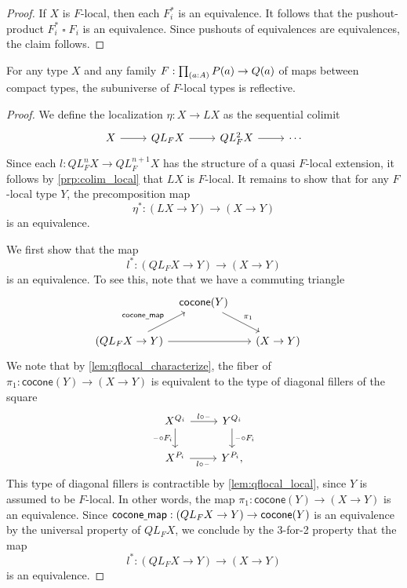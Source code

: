 \begin{proof}
If $X$ is $F$-local, then each $F_i^\ast$ is an equivalence. It follows that the pushout-product $F_i^\ast\mathbin{\square} F_i$ is an equivalence. Since pushouts of equivalences are equivalences, the claim follows.
\end{proof}

\begin{thm}\label{thm:localization}
For any type $X$ and any family $F:\prd{a:A}P(a)\to Q(a)$ of maps between
compact types, the subuniverse of $F$-local types is reflective.
\end{thm}

\begin{proof}
We define the localization $\eta:X\to LX$ as the sequential colimit
\begin{equation*}
\begin{tikzcd}
X \arrow[r] & QL_F X \arrow[r] & QL_F^2 X \arrow[r] & \cdots
\end{tikzcd}
\end{equation*}
Since each $l:QL_F^n X\to QL_F^{n+1}X$ has the structure of a quasi $F$-local extension, it follows by \cref{prp:colim_local} that $LX$ is $F$-local. It remains to show that for any $F$-local type $Y$, the precomposition map
\begin{equation*}
\eta^\ast : (LX\to Y)\to (X\to Y)
\end{equation*}
is an equivalence.

We first show that the map
\begin{equation*}
l^\ast : (QL_F X\to Y)\to (X\to Y)
\end{equation*}
is an equivalence. To see this, note that we have a commuting triangle
\begin{equation*}
\begin{tikzcd}[column sep=tiny]
& \mathsf{cocone}(Y) \arrow[dr,"\pi_1"] & \phantom{(QL_F X\to Y)} \\
(QL_F X\to Y) \arrow[rr] \arrow[ur,"\mathsf{cocone\usc{}map}"] & & (X\to Y)
\end{tikzcd}
\end{equation*}
We note that by \cref{lem:qflocal_characterize}, the fiber of $\pi_1:\mathsf{cocone}(Y)\to (X\to Y)$ is equivalent to the type of diagonal fillers of the square
\begin{equation*}
\begin{tikzcd}
X^{Q_i} \arrow[r,"l\circ\blank"] \arrow[d,swap,"\blank\circ F_i"] & Y^{Q_i} \arrow[d,"\blank\circ F_i"] \\
X^{P_i} \arrow[r,swap,"l\circ \blank"] & Y^{P_i},
\end{tikzcd}
\end{equation*}
This type of diagonal fillers is contractible by \cref{lem:qflocal_local}, since $Y$ is assumed to be $F$-local. In other words, the map $\pi_1:\mathsf{cocone}(Y)\to (X\to Y)$ is an equivalence. Since $\mathsf{cocone\underline{\ }{}map}:(QL_F X\to Y)\to \mathsf{cocone}(Y)$ is an equivalence by the universal property of $QL_F X$, we conclude by the 3-for-2 property that the map
\begin{equation*}
l^\ast : (QL_F X\to Y)\to (X\to Y)
\end{equation*}
is an equivalence.


\end{proof}
